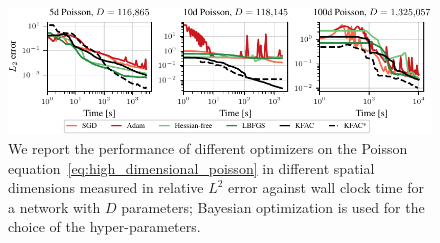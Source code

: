 \begin{figure}
    \centering
    \includegraphics{../kfac_pinns_exp/exp33_poisson_bayes_groupplot/l2_error_over_time.pdf}
    \caption{
    We report the performance of different optimizers on the Poisson equation~\eqref{eq:high_dimensional_poisson} in different spatial dimensions measured in relative $L^2$ error against wall clock time for a network with $D$ parameters; Bayesian optimization is used for the choice of the hyper-parameters.
    }
    \label{fig:10D-Poisson}
\end{figure}


